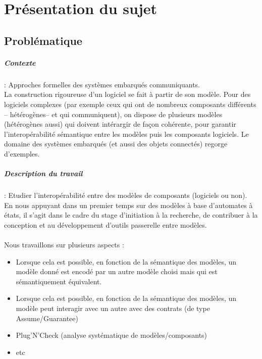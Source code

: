 \documentclass[12pt,a4paper]{report}
\begin{document}
\chapter{Présentation du sujet}


\section{Problématique}

\paragraph*{Contexte}: Approches formelles des systèmes embarqués communiquants.\\

La construction rigoureuse d'un logiciel se fait à partir de son modèle. Pour des 
logiciels complexes (par exemple ceux qui ont de nombreux composants différents -- 
hétérogènes-- et qui communiquent), on dispose de plusieurs modèles (hétérogènes 
aussi) qui doivent intérargir de façon cohérente, pour garantir l'interopérabilité 
sémantique entre les modèles puis les composants logiciels. Le domaine des systèmes 
embarqués (et aussi des objets connectés) regorge d'exemples.\\

\paragraph*{Description du travail}: Etudier l'interopérabilité entre des modèles de composants (logiciels ou non).\\
En nous appuyant dans un premier temps sur des modèles à base d'automates à états, il s'agit dans le cadre du stage
d'initiation à la recherche, de contribuer à la conception et au développement d'outils passerelle entre modèles.\\\\

Nous travaillons sur plusieurs aspects :\\
\begin{itemize}
  \item Lorsque cela est possible, en fonction de la sémantique des modèles, un modèle donné est encodé par un autre
modèle choisi mais qui est sémantiquement équivalent.
  \item Lorsque cela est possible, en fonction de la sémantique des modèles, un modèle peut interagir avec un autre avec
des contrats (de type Assume/Guarantee)
  \item Plug'N'Check (analyse systématique de modèles/composants)
  \item etc
\end{itemize}
\end{document}
